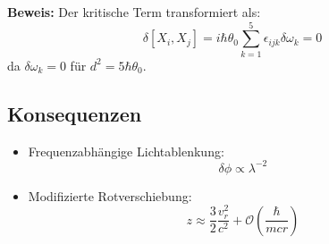 \textbf{Beweis:} Der kritische Term transformiert als:
\begin{equation}
\delta[X_i,X_j] = i\hbar\theta_0\sum_{k=1}^5 \epsilon_{ijk}\delta\omega_k = 0
\end{equation}
da $\delta\omega_k = 0$ für $d^2 = 5\hbar\theta_0$.

\subsection{Konsequenzen}

\begin{itemize}
\item Frequenzabhängige Lichtablenkung:
\begin{equation}
\delta\phi \propto \lambda^{-2}
\end{equation}

\item Modifizierte Rotverschiebung:
\begin{equation}
z \approx \frac{3}{2}\frac{v_r^2}{c^2} + \mathcal{O}\left(\frac{\hbar}{mcr}\right)
\end{equation}
\end{itemize}

